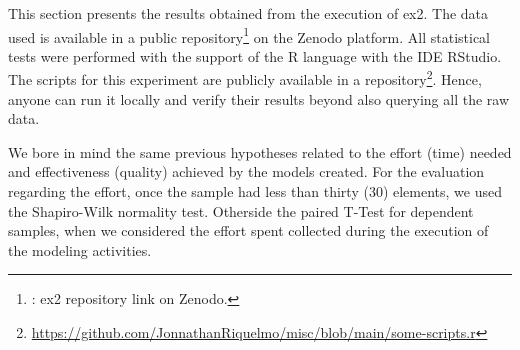 This section presents the results obtained from the execution of \ac{ex2}.
The data used is available in a public repository\footnote{: ex2 repository link on Zenodo.} on the Zenodo platform.
All statistical tests were performed with the support of the R language with the IDE RStudio.
The scripts for this experiment are publicly available in a repository\footnote{\url{https://github.com/JonnathanRiquelmo/misc/blob/main/some-scripts.r}}. 
Hence, anyone can run it locally and verify their results beyond also querying all the raw data.

We bore in mind the same previous hypotheses related to the effort (time) needed and effectiveness (quality) achieved by the models created.
For the evaluation regarding the effort, once the sample had less than thirty (30) elements, we used the Shapiro-Wilk normality test.
Otherside the paired T-Test for dependent samples, when we considered the effort spent collected during the execution of the modeling activities.

